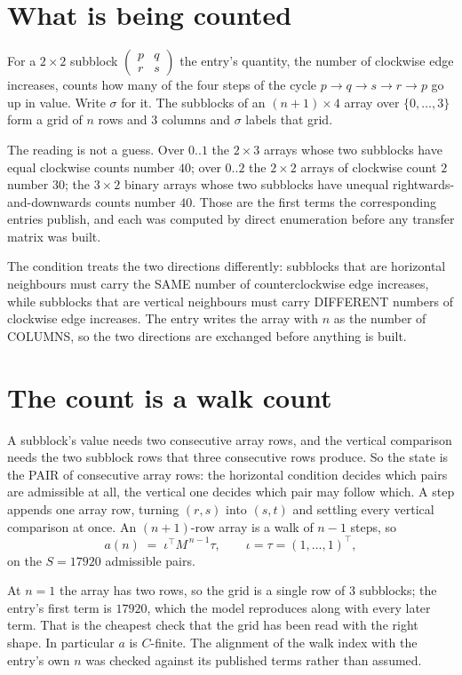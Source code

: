 \documentclass[11pt,a4paper]{article}
\theoremstyle{plain}
\theoremstyle{definition}
\begin{document}
\section{What is being counted}

For a $2\times2$ subblock $\begin{pmatrix}p&q\\r&s\end{pmatrix}$ the
entry's quantity, the number of clockwise edge increases, counts how many of the four steps of the cycle $p\to q\to s\to r\to p$ go up in value. Write $\sigma$ for it. The subblocks of an
$(n+1)\times4$ array over $\{0,\dots,3\}$ form a grid of $n$ rows and $3$
columns and $\sigma$ labels that grid.

The reading is not a guess. Over $0..1$ the $2\times3$ arrays whose two subblocks have equal
clockwise counts number $40$; over $0..2$ the $2\times2$ arrays of clockwise count $2$ number
$30$; the $3\times2$ binary arrays whose two subblocks have unequal rightwards-and-downwards
counts number $40$. Those are the first terms the corresponding entries publish, and each was
computed by direct enumeration before any transfer matrix was built.

The condition treats the two directions differently: subblocks that are horizontal neighbours
must carry the SAME number of counterclockwise edge increases, while subblocks that are vertical neighbours must carry
DIFFERENT numbers of clockwise edge increases. The entry writes the array with $n$ as the number of COLUMNS, so the two directions are exchanged before anything is built.

\section{The count is a walk count}

A subblock's value needs two consecutive array rows, and the vertical
comparison needs the two subblock rows that three consecutive rows produce. So the state is the
PAIR of consecutive array rows: the horizontal condition decides which pairs are admissible at
all, the vertical one decides which pair may follow which. A step appends one array row,
turning $(r,s)$ into $(s,t)$ and settling every vertical comparison at once. An $(n+1)$-row
array is a walk of $n-1$ steps, so
\[
a(n)\;=\;\iota^{\!\top}M^{\,n-1}\tau,\qquad\iota=\tau=(1,\dots,1)^{\!\top},
\]
on the $S=17920$ admissible pairs.

At $n=1$ the array has two rows, so the grid is a single row of $3$
subblocks; the entry's first term is $17920$, which the model
reproduces along with every later term. That is the cheapest check that the grid has been read
with the right shape.
In particular $a$ is $C$-finite. The alignment of the walk index with the entry's own $n$ was
checked against its published terms rather than assumed.
\end{document}
